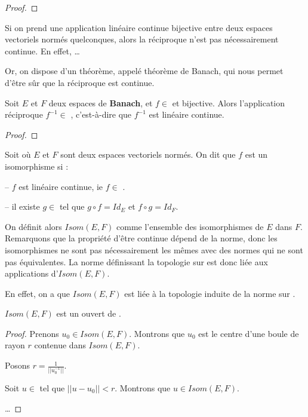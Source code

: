 \begin{proof}
	
\end{proof}


Si on prend une application linéaire continue bijective entre deux espaces
vectoriels normés quelconques, alors la réciproque n'est pas nécessairement
continue. En effet, \ldots %

Or, on dispose d'un théorème, appelé théorème de Banach, qui nous permet d'être
sûr que la réciproque est continue.

\begin{theorem} [Banach]
	\label{theorem_banach_isomorphism}
	Soit $E$ et $F$ deux espaces de \textbf{Banach}, et $f \in$
	 et bijective.
	Alors l'application réciproque $f^{-1} \in$ ,
	c'est-à-dire que $f^{-1}$ est linéaire continue.
\end{theorem}

\begin{proof}
	
\end{proof}

\begin{definition}
\label{definition_isomorphisme}
	Soit  où $E$ et $F$ sont deux espaces vectoriels
	normés.
	On dit que $f$ est un isomorphisme si :
	
	-- $f$ est linéaire continue, ie $f \in$ .

	-- il existe $g \in$  tel que $g \circ f = Id_{E}$ et
	$f \circ g = Id_{F}$.
\end{definition}

On définit alors $Isom(E, F)$ comme l'ensemble des isomorphismes de $E$ dans
$F$.
Remarquons que la propriété d'être continue dépend de la norme, donc les
isomorphismes ne sont pas nécessairement les mêmes avec des normes qui ne sont
pas équivalentes. La norme définissant la topologie sur 
est donc liée aux applications d'$Isom(E, F)$.

En effet, on a que $Isom(E, F)$ est liée à la topologie induite de la norme sur
.

\begin{proposition}
	$Isom(E, F)$ est un ouvert de .
\end{proposition}

\begin{proof}
	Prenons $u_{0} \in Isom(E, F)$. Montrons que $u_{0}$ est le centre d'une
	boule de rayon $r$ contenue dans $Isom(E, F)$.

	Posons $r = \frac{1}{||u_{0}^{-1}||}$.

	Soit $u \in $  tel que $||u - u_{0}|| < r$. Montrons
	que $u \in Isom(E, F)$.

	\ldots
\end{proof}

